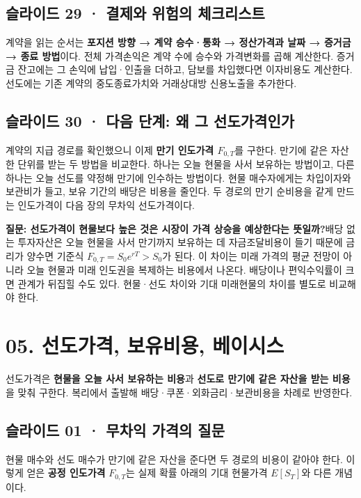\documentclass[11pt,a4paper]{article}
\begin{document}
\subsection{슬라이드 29 · 결제와 위험의 체크리스트}
계약을 읽는 순서는 \textbf{포지션 방향 → 계약 승수·통화 → 정산가격과 날짜 → 증거금 → 종료 방법}이다. 전체 가격손익은 계약 수에 승수와 가격변화를 곱해 계산한다. 증거금 잔고에는 그 손익에 납입·인출을 더하고, 담보를 차입했다면 이자비용도 계산한다. 선도에는 기존 계약의 중도종료가치와 거래상대방 신용노출을 추가한다.\par

\subsection{슬라이드 30 · 다음 단계: 왜 그 선도가격인가}
계약의 지급 경로를 확인했으니 이제 \textbf{만기 인도가격 $F_{0,T}$}를 구한다. 만기에 같은 자산 한 단위를 받는 두 방법을 비교한다. 하나는 오늘 현물을 사서 보유하는 방법이고, 다른 하나는 오늘 선도를 약정해 만기에 인수하는 방법이다. 현물 매수자에게는 차입이자와 보관비가 들고, 보유 기간의 배당은 비용을 줄인다. 두 경로의 만기 순비용을 같게 만드는 인도가격이 다음 장의 무차익 선도가격이다.\par

\par\medskip\noindent\textbf{질문: 선도가격이 현물보다 높은 것은 시장이 가격 상승을 예상한다는 뜻일까?}\quad 배당 없는 투자자산은 오늘 현물을 사서 만기까지 보유하는 데 자금조달비용이 들기 때문에 금리가 양수면 기준식 $F_{0,T}=S_0e^{rT}>S_0$가 된다. 이 차이는 미래 가격의 평균 전망이 아니라 오늘 현물과 미래 인도권을 복제하는 비용에서 나온다. 배당이나 편익수익률이 크면 관계가 뒤집힐 수도 있다. 현물·선도 차이와 기대 미래현물의 차이를 별도로 비교해야 한다.\par

\section{05. 선도가격, 보유비용, 베이시스}
선도가격은 \textbf{현물을 오늘 사서 보유하는 비용}과 \textbf{선도로 만기에 같은 자산을 받는 비용}을 맞춰 구한다. 복리에서 출발해 배당·쿠폰·외화금리·보관비용을 차례로 반영한다.\par

\subsection{슬라이드 01 · 무차익 가격의 질문}
현물 매수와 선도 매수가 만기에 같은 자산을 준다면 두 경로의 비용이 같아야 한다. 이렇게 얻은 \textbf{공정 인도가격} $F_{0,T}$는 실제 확률 아래의 기대 현물가격 $E[S_T]$와 다른 개념이다.\par
\end{document}
